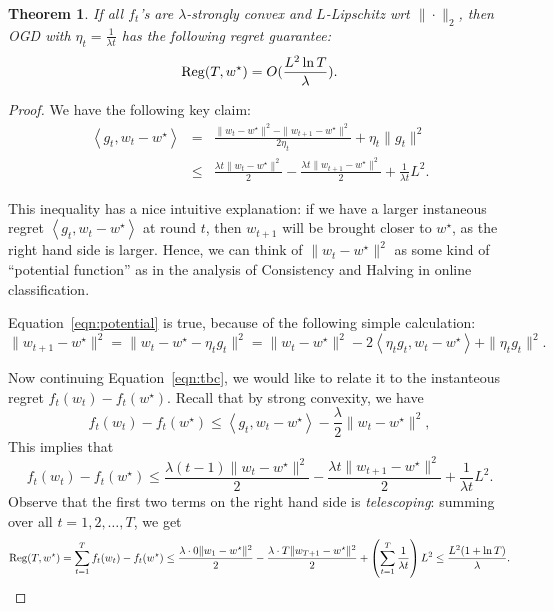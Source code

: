 \documentclass{article}
\newtheorem{theorem}{Theorem}
\DeclareMathOperator*{\Reg}{{\rm Reg}}
\newcommand{\inner}[2]{\left\langle #1,#2 \right\rangle}
\begin{document}
\begin{theorem}
If all $f_t$'s are $\lambda$-strongly convex and $L$-Lipschitz wrt $\| \cdot \|_2$, then OGD with $\eta_t = \frac{1}{\lambda t}$ has the following regret guarantee:
\[ \Reg(T, w^\star) = O(\frac{L^2 \ln T}{\lambda}). \]
\label{thm:log-ogd}
\end{theorem}
\begin{proof}

We have the following key claim:
\begin{eqnarray}
  \inner{g_t}{w_t - w^\star} &=& \frac{\| w_t - w^\star \|^2 - \| w_{t+1} - w^\star \|^2}{2\eta_t} + \eta_t \| g_t \|^2 \label{eqn:potential} \\
  &\leq& \frac{\lambda t \| w_t - w^\star \|^2}{2} - \frac{\lambda t \| w_{t+1} - w^\star \|^2}{2} + \frac{1}{\lambda t} L^2.
  \label{eqn:tbc}
\end{eqnarray}

This inequality has a nice intuitive explanation: if we have a larger instaneous regret $\inner{g_t}{w_t - w^\star}$ at round $t$, then $w_{t+1}$ will be brought closer to $w^\star$, as the right hand side is larger. Hence, we can think of $\| w_t - w^\star \|^2$ as some kind of ``potential function'' as in the analysis of Consistency and Halving in online classification.

Equation~\eqref{eqn:potential} is true, because of the following simple calculation:
\[ \| w_{t+1} - w^\star \|^2 = \| w_t - w^\star - \eta_t g_t \|^2 = \| w_t - w^\star \|^2 - 2\inner{\eta_t g_t}{w_t - w^\star} + \| \eta_t g_t \|^2.  \]

Now continuing Equation~\ref{eqn:tbc}, we would like to relate it to the instanteous regret $f_t(w_t) - f_t(w^\star)$. Recall that by strong convexity, we have
\[ f_t(w_t) - f_t(w^\star) \leq  \inner{g_t}{w_t - w^\star} - \frac{\lambda}{2}\| w_t - w^\star \|^2, \]
This implies that
\[ f_t(w_t) - f_t(w^\star) \leq \frac{\lambda (t-1) \| w_t - w^\star \|^2}{2} - \frac{\lambda t \| w_{t+1} - w^\star \|^2}{2} + \frac{1}{\lambda t} L^2. \]
Observe that the first two terms on the right hand side is {\em telescoping}: summing over all $t = 1,2,\ldots,T$, we get
\[ \Reg(T, w^\star) = \sum_{t=1}^T f_t(w_t) - f_t(w^\star) \leq \frac{\lambda \cdot 0 \| w_1 - w^\star \|^2}{2} - \frac{\lambda \cdot T \| w_{T+1} - w^\star \|^2}{2} + \del{\sum_{t=1}^T \frac{1}{\lambda t}} L^2
\leq \frac{L^2 (1 + \ln T)}{\lambda}. \]

\end{proof}
\end{document}
